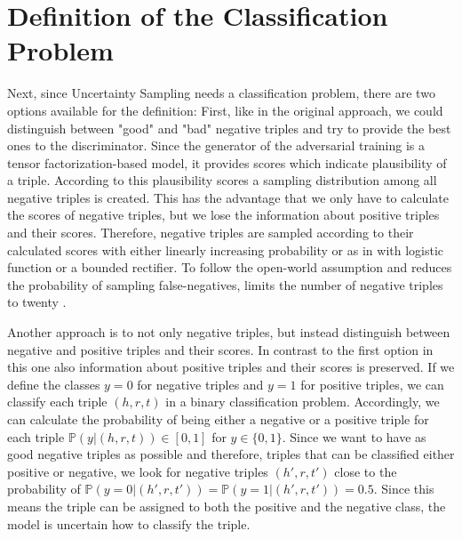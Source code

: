 \section{Definition of the Classification Problem}
\label{sec:definition_of_the_classification_problem}
Next, since Uncertainty Sampling needs a classification problem, there are two options available for the definition:
First, like in the original \kbgan approach, we could distinguish between "good" and "bad" negative triples and try to provide the best ones to the discriminator.
Since the generator of the adversarial training is a tensor factorization-based model, it provides scores which indicate plausibility of a triple.
According to this plausibility scores a sampling distribution among all negative triples is created. 
This has the advantage that we only have to calculate the scores of negative triples, but we lose the information about positive triples and their scores.
Therefore, negative triples are sampled according to their calculated scores with either linearly increasing probability or as in \cite{UKGE} with logistic function or a bounded rectifier.
To follow the open-world assumption and reduces the probability of sampling false-negatives,
\kbgan limits the number of negative triples to twenty \cite{cai2017kbgan}.

Another approach is to not only negative triples, but instead distinguish between negative and positive triples and their scores.
In contrast to the first option in this one also information about positive triples and their scores is preserved.
If we define the classes $y = 0$  for negative triples and $y = 1$ for positive triples, we can classify each triple $(h,r,t)$ in a binary classification problem.
Accordingly, we can calculate the probability of being either a negative or a positive triple for each triple $\mathbb{P}(y| (h,r,t)) \in [0,1]$ for $y \in \{0,1\}$.
Since we want to have as good negative triples as possible and therefore, triples that can be classified either positive or negative, we look for negative triples $(h',r,t')$ close to the probability of $\mathbb{P}(y = 0| (h',r,t')) = \mathbb{P}(y = 1| (h',r,t')) = 0.5$.
Since this means the triple can be assigned to both the positive and the negative class, 
the model is uncertain how to classify the triple.

